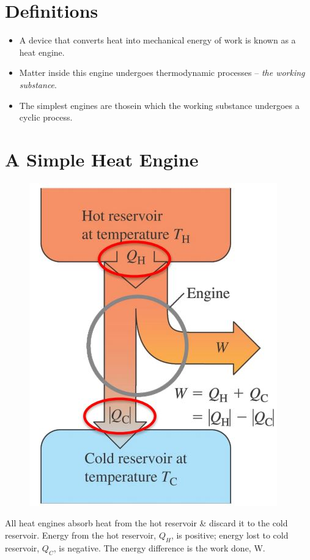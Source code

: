 \documentclass[a4paper, 11pt, normalem]{report}
\begin{document}
\section{Definitions}
\begin{itemize}
    \item A device that converts heat into mechanical energy of work is known as a heat engine.
    \item Matter inside this engine undergoes thermodynamic processes -- \emph{the working substance}.
    \item The simplest engines are thosein which the working substance undergoes a cyclic process.
\end{itemize}

\section{A Simple Heat Engine}
\begin{figure}[H]
    \centering
    \includegraphics[scale=0.7]{HeatEngine.jpg}
\end{figure}
All heat engines absorb heat from the hot reservoir \& discard it to the cold reservoir.
Energy from the hot reservoir, $Q_{H}$, is positive; energy lost to cold reservoir, $Q_{C}$, is negative.
The energy difference is the work done, W.
\end{document}
